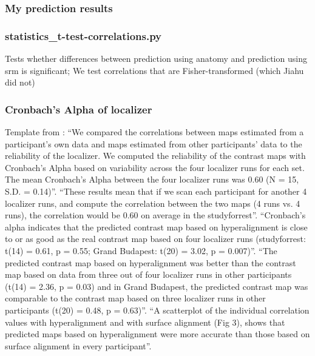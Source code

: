 \subsubsection{My prediction results}




\subsubsection{statistics\_t-test-correlations.py}

Tests whether differences between prediction using anatomy and prediction using
\ac{srm} is significant;
%
We test correlations that are Fisher-transformed (which Jiahu did not)


\subsubsection{Cronbach's Alpha of localizer}



Template from \citet{jiahui2020predicting}: ``We compared the correlations
between maps estimated from a participant's own data and maps estimated from
other participants' data to the reliability of the localizer. We computed the
reliability of the contrast maps with Cronbach's Alpha based on variability
across the four localizer runs for each set. The mean Cronbach's Alpha between
the four localizer runs was 0.60 (N = 15, S.D. = 0.14)''.
%
``These results mean that if we scan each participant for another 4 localizer
runs, and compute the correlation between the two maps (4 runs vs. 4 runs), the
correlation would be 0.60 on average in the studyforrest''.
%
``Cronbach's alpha indicates that the predicted contrast map based on
hyperalignment is close to or as good as the real contrast map based on four
localizer runs (studyforrest: t(14) = 0.61, p = 0.55; Grand Budapest: t(20) =
3.02, p = 0.007)''.
%
``The predicted contrast map based on hyperalignment was better than the
contrast map based on data from three out of four localizer runs in other
participants (t(14) = 2.36, p = 0.03) and in Grand Budapest, the predicted
contrast map was comparable to the contrast map based on three localizer runs in
other participants (t(20) = 0.48, p = 0.63)''.
%
``A scatterplot of the individual correlation values with hyperalignment and
with surface alignment (Fig 3), shows that predicted maps based on
hyperalignment were more accurate than those based on surface alignment in every
participant''.


